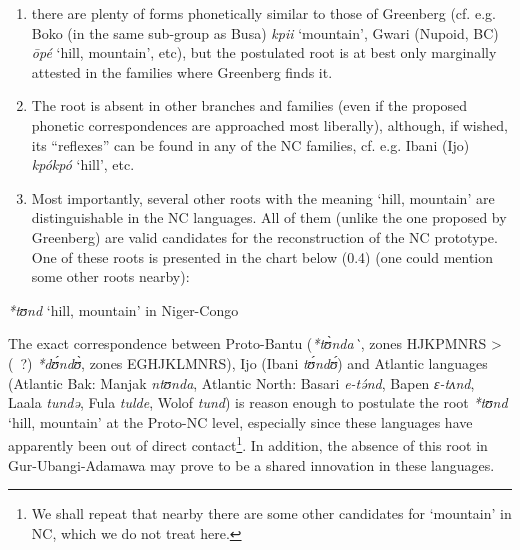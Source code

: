 \begin{enumerate}
\item there are plenty of forms phonetically similar to those of Greenberg (cf. e.g. Boko (in the same sub-group as Busa) \textit{kpii} ‘mountain’, Gwari (Nupoid, BC) \textit{{\={o}}p{\'{e}}} ‘hill, mountain’, etc), but the postulated root is at best only marginally attested in the families where Greenberg finds it. 
\item The root is absent in other branches and families (even if the proposed phonetic correspondences are approached most liberally), although, if wished, its “reflexes” can be found in any of the NC families, cf. e.g. Ibani (Ijo) \textit{kp{\'{o}}kp{\'{o}}} ‘hill’, etc. 
\item Most importantly, several other roots with the meaning ‘hill, mountain’ are distinguishable in the NC languages. All of them (unlike the one proposed by Greenberg) are valid candidates for the reconstruction of the NC prototype. One of these roots is presented in the chart below (0.4) (one could mention some other roots nearby):
\end{enumerate}


\begin{table}
\caption{\textit{*tʊnd} ‘hill, mountain’ in Niger-Congo} 
\label{tab:0.4}

\end{table}

The exact correspondence between Proto-Bantu (\textit{*t{\`{ʊ}}nda\`{}}, zones HJKPMNRS > (~?) \textit{*d{\'{ʊ}}nd{\`{ʊ}}},  zones EGHJKLMNRS), Ijo (Ibani \textit{t{\'{ʊ}}nd{\'{ʊ}}}) and Atlantic languages (Atlantic Bak: Manjak \textit{ntʊnda}, Atlantic North: Basari \textit{e-t{\'{ə}}nd}, Bapen \textit{ɛ{}-tʌnd}, Laala \textit{tundə}, Fula \textit{tulde}, Wolof \textit{tund}) is reason enough to postulate the root \textit{*tʊnd} ‘hill, mountain’ at the Proto-NC level, especially since these languages have apparently been out of direct contact\footnote{We shall repeat that nearby there are some other candidates for ‘mountain’ in NC, which we do not treat here.}. In addition, the absence of this root in Gur{}-Ubangi{}-Adamawa may prove to be a shared innovation in these languages.

